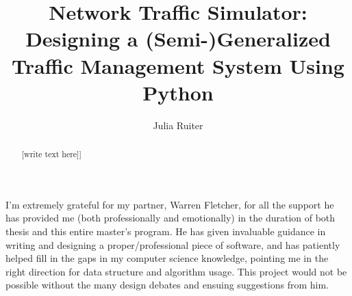 \documentclass[a4paper,11pt,twoside]{UUthesis}
\title{Network Traffic Simulator:  \\ Designing a (Semi-)Generalized Traffic Management System Using Python}
\author{Julia Ruiter}
\theoremstyle{definition}
\theoremstyle{remark}
\begin{document}

\frontmatter

\maketitle %


\begin{abstract} 
[write text here]]
\end{abstract}

\begin{acknowledgments}
I'm extremely grateful for my partner, Warren Fletcher, for all the support he has provided me (both professionally and emotionally) in the duration of both thesis and this entire master's program. He has given invaluable guidance in writing and designing a proper/professional piece of software, and has patiently helped fill in the gaps in my computer science knowledge, pointing me in the right direction for data structure and algorithm usage.  This project would not be possible without the many design debates and ensuing suggestions from him.
\end{acknowledgments}

\tableofcontents
\listoffigures


\mainmatter






% 





\backmatter

%
\nocite{*} %




\end{document}

